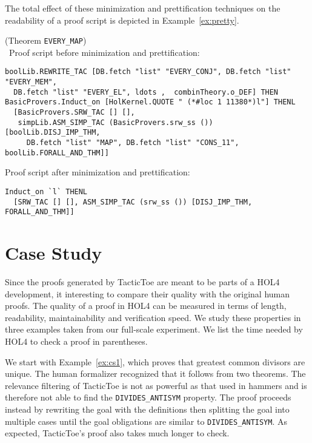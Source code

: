 \documentclass[runningheads,a4paper,draft]{svjour3}
\def\holfour{\textsf{HOL4}\xspace}
\def\tactictoe{\textsf{TacticToe}\xspace}
\begin{document}
The total effect of these minimization and prettification techniques
on the readability of a proof script is depicted in
Example~\ref{ex:pretty}.

\begin{example}(Theorem \texttt{EVERY\_MAP})\label{ex:pretty}\\\
Proof script before minimization and prettification:
\begin{lstlisting}[language=SMLSmall]
boolLib.REWRITE_TAC [DB.fetch "list" "EVERY_CONJ", DB.fetch "list" "EVERY_MEM",
  DB.fetch "list" "EVERY_EL", ldots ,  combinTheory.o_DEF] THEN
BasicProvers.Induct_on [HolKernel.QUOTE " (*#loc 1 11380*)l"] THENL
  [BasicProvers.SRW_TAC [] [],
   simpLib.ASM_SIMP_TAC (BasicProvers.srw_ss ()) [boolLib.DISJ_IMP_THM,
     DB.fetch "list" "MAP", DB.fetch "list" "CONS_11", boolLib.FORALL_AND_THM]]

\end{lstlisting}
Proof script after minimization and prettification:
\begin{lstlisting}[language=SMLSmall]
Induct_on `l` THENL
  [SRW_TAC [] [], ASM_SIMP_TAC (srw_ss ()) [DISJ_IMP_THM, FORALL_AND_THM]]
\end{lstlisting}
\end{example}

\section{Case Study}\label{sec:case_study}
Since the proofs generated by \tactictoe are meant to be parts of a \holfour development, it interesting to compare their quality with the original human proofs.
The quality of a proof in \holfour can be measured in terms of length, readability, maintainability and verification speed.
We study these properties in three examples taken from our full-scale experiment.
We list the time needed by \holfour to check a proof in parentheses.

We start with Example~\ref{ex:cs1}, which proves that greatest common divisors are unique.
The human formalizer recognized that it follows from two theorems.
The relevance filtering of \tactictoe is not as powerful as that used in hammers
and is therefore not able to find the \texttt{DIVIDES\_ANTISYM} property. The proof
proceeds instead by rewriting the
goal with the definitions then splitting the goal into multiple cases until the goal obligations are similar
to \texttt{DIVIDES\_ANTISYM}. As expected, \tactictoe's proof
also takes much longer to check.
\end{document}
